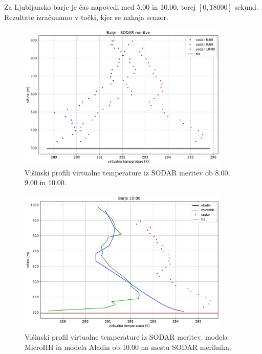 \documentclass[mat2, tisk]{fmfdelo}
\begin{document}
Za Ljubljansko barje je čas napovedi med 5.00 in 10.00, torej $[0, 18000]$ sekund.
Rezultate izračunamo v točki, kjer se nahaja senzor. 
\begin{figure}[h!]
  \centering
  \includegraphics[width=0.9\textwidth]{rezultati/barje_sodar_tv_345.pdf}
  \caption{Višinski profili virtualne temperature iz SODAR meritev ob 8.00, 9.00 in 10.00.}
  \label{fig:barje_T3}
\end{figure}

\begin{figure}[h!]
  \centering
  \includegraphics[width=0.9\textwidth]{rezultati/tv_barje_long_5.pdf}
  \caption{Višinski profil virtualne temperature iz SODAR meritev, modela MicroHH in modela Aladin ob 10.00 na mestu SODAR merilnika.}
  \label{fig:barje_T4}
\end{figure}
\end{document}

